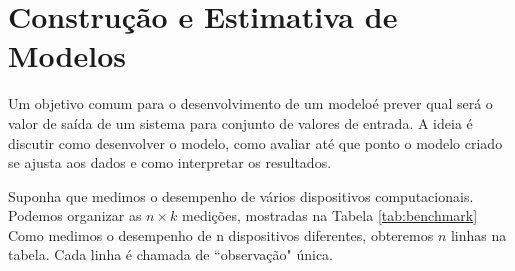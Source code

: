 \documentclass[article]{memoir}
\begin{document}
\section{Construção e Estimativa de Modelos}

Um objetivo comum para o desenvolvimento de um modeloé prever qual será o valor de saída de um sistema para conjunto de valores de entrada. A ideia é discutir como desenvolver o modelo, como avaliar
até que ponto o modelo criado se ajusta aos dados e como interpretar os resultados. 

Suponha que medimos o desempenho de vários dispositivos computacionais. Podemos organizar  as $n \times k$ medições, mostradas na Tabela  \ref{tab:benchmark} Como medimos o desempenho de n dispositivos diferentes, obteremos $n$ linhas na tabela. Cada linha é chamada de ``observação" única.
\end{document}
